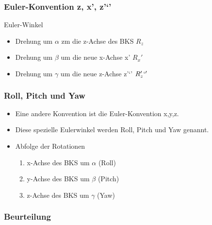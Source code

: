 \documentclass[paper=a4, fontsize=11pt]{scrartcl} %
\numberwithin{equation}{section} %
\numberwithin{figure}{section} %
\numberwithin{table}{section} %
\begin{document}
\subsubsection{Euler-Konvention z, x', z'`'}

Euler-Winkel
\begin{itemize}
\item Drehung um $\alpha$ zm die z-Achse des BKS $R_z$
\item Drehung um $\beta$ um die neue x-Achse x' $R_x'$
\item Drehung um $\gamma$ um die neue z-Achse z'`' $R_z'`'$
\end{itemize}

\subsubsection{Roll, Pitch und Yaw}

\begin{itemize}
\item Eine andere Konvention ist die Euler-Konvention x,y,z.
\item Diese spezielle Eulerwinkel werden Roll, Pitch und Yaw genannt.
\item Abfolge der Rotationen
\begin{enumerate}
\item x-Achse des BKS um $\alpha$ (Roll)
\item y-Achse des BKS um $\beta$ (Pitch)
\item z-Achse des BKS um $\gamma$ (Yaw)
\end{enumerate}
\end{itemize}

\subsubsection{Beurteilung}
\end{document}
